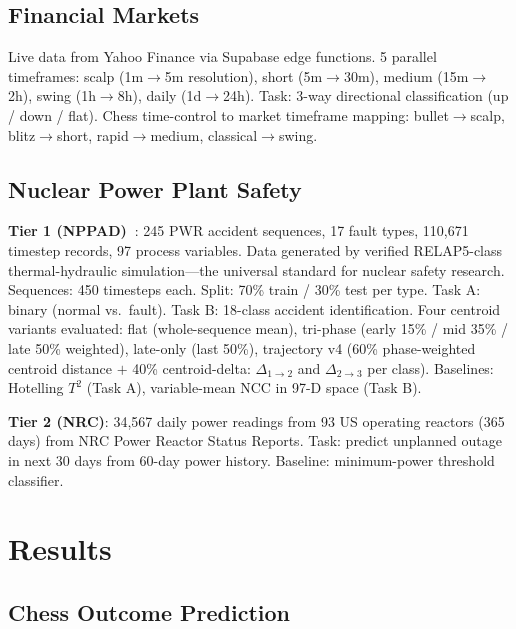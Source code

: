 \documentclass[12pt,a4paper]{article}
\begin{document}
\subsection{Financial Markets}
Live data from Yahoo Finance via Supabase edge functions. 5 parallel timeframes:
scalp (1m$\rightarrow$5m resolution), short (5m$\rightarrow$30m), medium (15m$\rightarrow$2h),
swing (1h$\rightarrow$8h), daily (1d$\rightarrow$24h). Task: 3-way directional classification (up
/ down / flat). Chess time-control to market timeframe mapping: bullet$\rightarrow$scalp,
blitz$\rightarrow$short, rapid$\rightarrow$medium, classical$\rightarrow$swing.

\subsection{Nuclear Power Plant Safety}
\textbf{Tier 1 (NPPAD)~\cite{nppad2022}}: 245 PWR accident sequences, 17 fault types, 110,671
timestep records, 97 process variables. Data generated by verified RELAP5-class thermal-hydraulic
simulation---the universal standard for nuclear safety research. Sequences: 450 timesteps each.
Split: 70\% train / 30\% test per type. Task A: binary (normal vs.\ fault). Task B: 18-class
accident identification. Four centroid variants evaluated: flat (whole-sequence mean), tri-phase
(early 15\% / mid 35\% / late 50\% weighted), late-only (last 50\%), trajectory v4 (60\%
phase-weighted centroid distance $+$ 40\% centroid-delta: $\Delta_{1\to2}$ and $\Delta_{2\to3}$
per class). Baselines: Hotelling $T^2$ (Task A), variable-mean NCC in 97-D space (Task B).

\textbf{Tier 2 (NRC)}: 34,567 daily power readings from 93 US operating reactors (365 days) from
NRC Power Reactor Status Reports. Task: predict unplanned outage in next 30 days from 60-day power
history. Baseline: minimum-power threshold classifier.


\section{Results}

\subsection{Chess Outcome Prediction}
\end{document}
